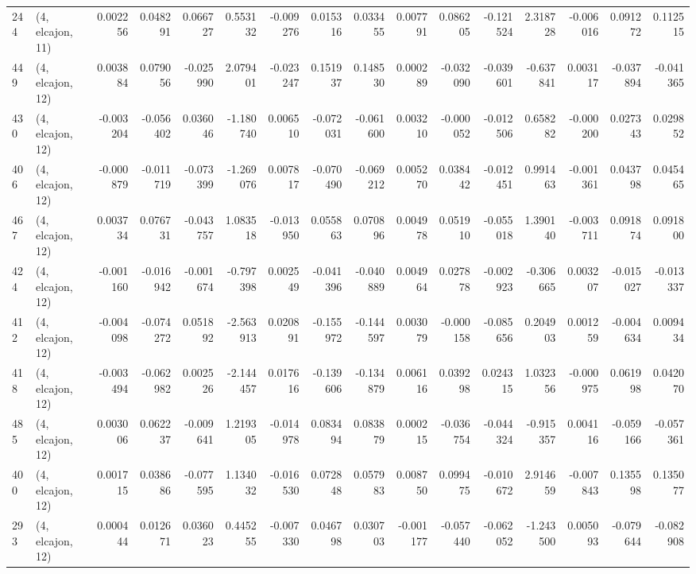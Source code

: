 \begin{tabular}{llrrrrrrrrrrrrrr}
244 &  (4, elcajon, 11) &   0.002256 &  0.048291 &  0.066727 &    0.553132 & -0.009276 &   0.015316 &  0.033455 &  0.007791 &  0.086205 & -0.121524 &    2.318728 & -0.006016 &  0.091272 &  0.112515 \\
449 &  (4, elcajon, 12) &   0.003884 &  0.079056 & -0.025990 &    2.079401 & -0.023247 &   0.151937 &  0.148530 &  0.000289 & -0.032090 & -0.039601 &   -0.637841 &  0.003117 & -0.037894 & -0.041365 \\
430 &  (4, elcajon, 12) &  -0.003204 & -0.056402 &  0.036046 &   -1.180740 &  0.006510 &  -0.072031 & -0.061600 &  0.003210 & -0.000052 & -0.012506 &    0.658282 & -0.000200 &  0.027343 &  0.029852 \\
406 &  (4, elcajon, 12) &  -0.000879 & -0.011719 & -0.073399 &   -1.269076 &  0.007817 &  -0.070490 & -0.069212 &  0.005270 &  0.038442 & -0.012451 &    0.991463 & -0.001361 &  0.043798 &  0.045465 \\
467 &  (4, elcajon, 12) &   0.003734 &  0.076731 & -0.043757 &    1.083518 & -0.013950 &   0.055863 &  0.070896 &  0.004978 &  0.051910 & -0.055018 &    1.390140 & -0.003711 &  0.091874 &  0.091800 \\
424 &  (4, elcajon, 12) &  -0.001160 & -0.016942 & -0.001674 &   -0.797398 &  0.002549 &  -0.041396 & -0.040889 &  0.004964 &  0.027878 & -0.002923 &   -0.306665 &  0.003207 & -0.015027 & -0.013337 \\
412 &  (4, elcajon, 12) &  -0.004098 & -0.074272 &  0.051892 &   -2.563913 &  0.020891 &  -0.155972 & -0.144597 &  0.003079 & -0.000158 & -0.085656 &    0.204903 &  0.001259 & -0.004634 &  0.009434 \\
418 &  (4, elcajon, 12) &  -0.003494 & -0.062982 &  0.002526 &   -2.144457 &  0.017616 &  -0.139606 & -0.134879 &  0.006116 &  0.039298 &  0.024315 &    1.032356 & -0.000975 &  0.061998 &  0.042070 \\
485 &  (4, elcajon, 12) &   0.003006 &  0.062237 & -0.009641 &    1.219305 & -0.014978 &   0.083494 &  0.083879 &  0.000215 & -0.036754 & -0.044324 &   -0.915357 &  0.004116 & -0.059166 & -0.057361 \\
400 &  (4, elcajon, 12) &   0.001715 &  0.038686 & -0.077595 &    1.134032 & -0.016530 &   0.072848 &  0.057983 &  0.008750 &  0.099475 & -0.010672 &    2.914659 & -0.007843 &  0.135598 &  0.135077 \\
293 &  (4, elcajon, 12) &   0.000444 &  0.012671 &  0.036023 &    0.445255 & -0.007330 &   0.046798 &  0.030703 & -0.001177 & -0.057440 & -0.062052 &   -1.243500 &  0.005093 & -0.079644 & -0.082908 \\

\end{tabular}
